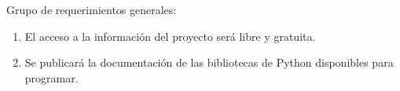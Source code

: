 Grupo de requerimientos generales:
\begin{enumerate}
	\item  El acceso a la información del proyecto será libre y gratuita.  
	\item  Se publicará la documentación de las bibliotecas de Python disponibles para programar.
\end{enumerate}




